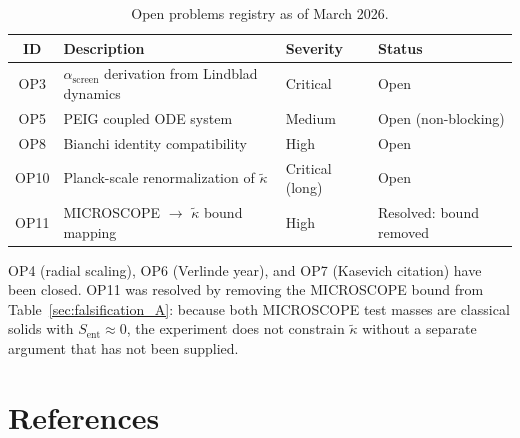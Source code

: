 \documentclass[12pt,letterpaper]{article}
\theoremstyle{plain}
\theoremstyle{definition}
\theoremstyle{remark}
\newcommand{\Sent}{S_{\mathrm{ent}}}
\newcommand{\ascreen}{\alpha_{\mathrm{screen}}}
\begin{document}
\begin{table}[H]
\centering
\caption{Open problems registry as of March 2026.}
\renewcommand{\arraystretch}{1.25}
\begin{tabular}{@{}clll@{}}
\toprule
\textbf{ID} & \textbf{Description} & \textbf{Severity} & \textbf{Status} \\
\midrule
OP3 & $\ascreen$ derivation from Lindblad dynamics & Critical & Open \\
OP5 & PEIG coupled ODE system & Medium & Open (non-blocking) \\
OP8 & Bianchi identity compatibility & High & Open \\
OP10 & Planck-scale renormalization of $\tilde\kappa$ & Critical (long) & Open \\
OP11 & MICROSCOPE $\to$ $\tilde\kappa$ bound mapping & High & Resolved: bound removed \\
\bottomrule
\end{tabular}
\end{table}

OP4 (radial scaling), OP6 (Verlinde year), and OP7 (Kasevich citation)
have been closed. OP11 was resolved by removing the MICROSCOPE bound from
Table~\ref{sec:falsification_A}: because both MICROSCOPE test masses are
classical solids with $\Sent \approx 0$, the experiment does not constrain
$\tilde\kappa$ without a separate argument that has not been supplied.

\newpage
\section*{References}
\end{document}
